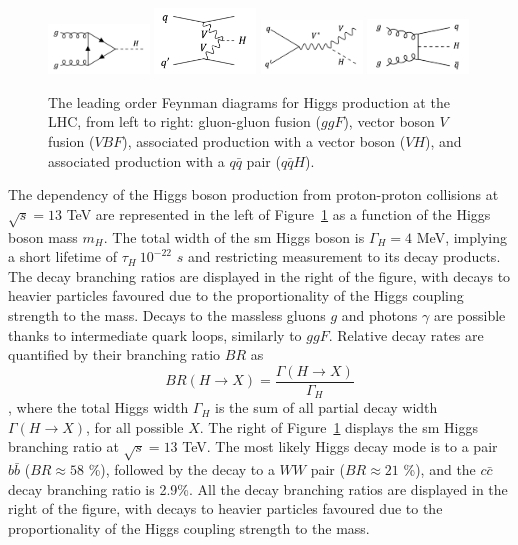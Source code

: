 \begin{figure}[h!]
    \center
    \includegraphics[width=0.24\textwidth]{Images/Theory/ggH.png}
    \includegraphics[width=0.24\textwidth]{Images/Theory/vvH.png}
    \includegraphics[width=0.24\textwidth]{Images/Theory/vh.png}
    \includegraphics[width=0.24\textwidth]{Images/Theory/qqH.png}
    \caption{The leading order Feynman diagrams for Higgs production at the LHC, from left to right: gluon-gluon fusion ($ggF$), vector boson $V$ fusion ($VBF$), associated production with a vector boson ($VH$), and associated production with a $q\bar{q}$ pair ($q\bar{q}H$).}
    \label{fig:prodH}
\end{figure}

The dependency of the Higgs boson production from proton-proton collisions at $\sqrt{s} = 13$ TeV are represented in the left of Figure~\ref{fig:prodH} as a function of the Higgs boson mass $m_H$. The total width of the \gls{sm} Higgs boson is $\Gamma_H = 4$ MeV, implying a short lifetime of $\tau_H ~ 10^{-22}$ $s$ and restricting measurement to its decay products. The decay branching ratios are displayed in the right of the figure, with decays to heavier particles favoured due to the proportionality of the Higgs coupling strength to the mass. Decays to the massless gluons $g$ and photons $\gamma$ are possible thanks to intermediate quark loops, similarly to $ggF$. Relative decay rates are quantified by their branching ratio $BR$ as
\begin{equation}
    BR(H \rightarrow X) = \frac{\Gamma(H\rightarrow X)}{\Gamma_H}
\end{equation},
where the total Higgs width $\Gamma_H$ is the sum of all partial decay width $\Gamma(H\rightarrow X)$, for all possible $X$. The right of Figure~\ref{fig:prodH} displays the \gls{sm} Higgs branching ratio at $\sqrt{s} = 13$ TeV. The most likely Higgs decay mode is to a pair $b\bar{b}$ ($BR \approx 58$ \%), followed by the decay to a $WW$ pair ($BR \approx 21$ \%), and the $c\bar{c}$ decay branching ratio is 2.9\%. All the decay branching ratios are displayed in the right of the figure, with decays to heavier particles favoured due to the proportionality of the Higgs coupling strength to the mass. \\

